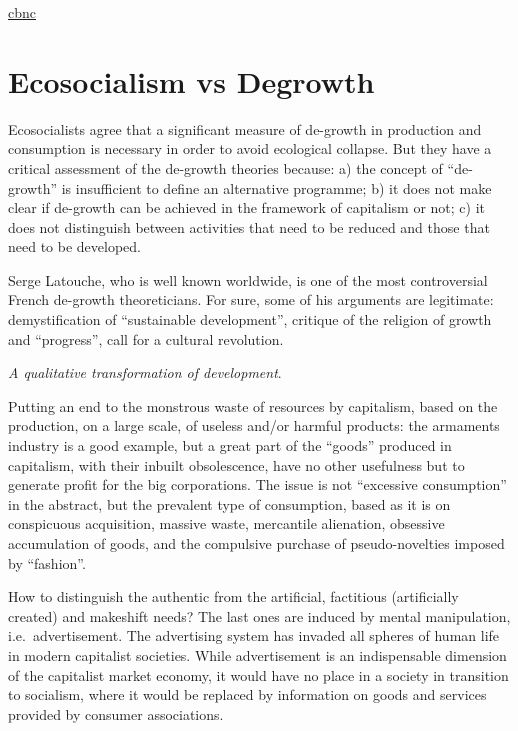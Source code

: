 \documentclass[
]{book}
\begin{document}
\href{https://www.cnbc.com/amp/2021/02/19/degrowth-pushing-social-wellbeing-and-climate-over-economic-growth.html}{cbnc}

\hypertarget{ecosocialism-vs-degrowth}{%
\section{Ecosocialism vs Degrowth}\label{ecosocialism-vs-degrowth}}

Ecosocialists agree that a significant measure of de-growth in production and consumption is necessary in order to avoid ecological collapse. But they have a critical assessment of the de-growth theories because: a) the concept of ``de-growth'' is insufficient to define an alternative programme; b) it does not make clear if de-growth can be achieved in the framework of capitalism or not; c) it does not distinguish between activities that need to be reduced and those that need to be developed.

Serge Latouche, who is well known worldwide, is one of the most controversial French de-growth theoreticians. For sure, some of his arguments are legitimate: demystification of ``sustainable development'', critique of the religion of growth and ``progress'', call for a cultural revolution.

\emph{A qualitative transformation of development}.

Putting an end to the monstrous waste of resources by capitalism, based on the production, on a large scale, of useless and/or harmful products: the armaments industry is a good example, but a great part of the ``goods'' produced in capitalism, with their inbuilt obsolescence, have no other usefulness but to generate profit for the big corporations. The issue is not ``excessive consumption'' in the abstract, but the prevalent type of consumption, based as it is on conspicuous acquisition, massive waste, mercantile alienation, obsessive accumulation of goods, and the compulsive purchase of pseudo-novelties imposed by ``fashion''.

How to distinguish the authentic from the artificial, factitious (artificially created) and makeshift needs? The last ones are induced by mental manipulation, i.e.~advertisement. The advertising system has invaded all spheres of human life in modern capitalist societies.
While advertisement is an indispensable dimension of the capitalist market economy, it would have no place in a society in transition to socialism, where it would be replaced by information on goods and services provided by consumer associations.
\end{document}
